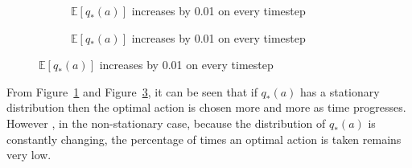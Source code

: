 \documentclass[10pt]{article}
\begin{document}
\begin{figure}[H]
\begin{subfigure}{0.45\textwidth}
			\label{f1}
		\end{subfigure}
		\begin{subfigure}{0.45\textwidth}
			\caption{$\mathbb{E}\left[ q_{*}(a) \right]$ increases by 0.01 on every timestep}
		\end{subfigure}
		\begin{subfigure}{0.45\textwidth}
			\caption{$\mathbb{E}\left[ q_{*}(a) \right]$ increases by 0.01 on every timestep}
			\label{f2}
		\end{subfigure}
	\end{figure}
	From Figure~\ref{f1} and Figure~\ref{f2}, it can be seen that if $q_{*}(a)$ has a stationary distribution then the optimal action is chosen more and more as time progresses. However , in the non-stationary case, because the distribution of $q_{*}(a)$ is constantly changing, the percentage of times an optimal action is taken remains very low.
\end{document}
